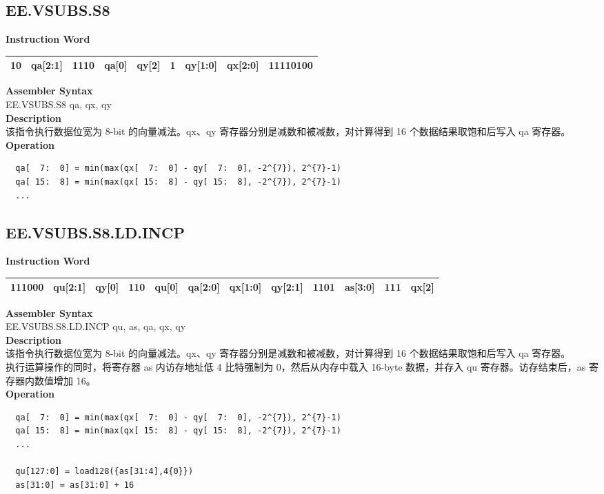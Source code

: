 \clearpage
\subsection{EE.VSUBS.S8}\label{instruction:EEVSUBSS8}
\setlength\tabcolsep{6pt}
\textbf{Instruction Word} \\
\begin{tabular}{|c|c|c|c|c|c|c|c|c|}
	\hline
	10 & qa[2:1] & 1110 & qa[0] & qy[2] & 1 & qy[1:0] & qx[2:0] & 11110100 \\
	\hline
\end{tabular}

\textbf{Assembler Syntax} \\
EE.VSUBS.S8 qa, qx, qy \\
\textbf{Description} \\
该指令执行数据位宽为 8-bit 的向量减法。qx、qy 寄存器分别是减数和被减数，对计算得到 16 个数据结果取饱和后写入 qa 寄存器。\\
\textbf{Operation}
\begin{lstlisting}
  qa[  7:  0] = min(max(qx[  7:  0] - qy[  7:  0], -2^{7}), 2^{7}-1)
  qa[ 15:  8] = min(max(qx[ 15:  8] - qy[ 15:  8], -2^{7}), 2^{7}-1)
  ...
\end{lstlisting}

\clearpage
\subsection{EE.VSUBS.S8.LD.INCP}\label{instruction:EEVSUBSS8LDINCP}
\setlength\tabcolsep{6pt}
\textbf{Instruction Word} \\
\begin{tabular}{|c|c|c|c|c|c|c|c|c|c|c|c|}
	\hline
	111000 & qu[2:1] & qy[0] & 110 & qu[0] & qa[2:0] & qx[1:0] & qy[2:1] & 1101 & as[3:0] & 111 & qx[2] \\
	\hline
\end{tabular}

\textbf{Assembler Syntax} \\
EE.VSUBS.S8.LD.INCP qu, as, qa, qx, qy \\
\textbf{Description} \\
该指令执行数据位宽为 8-bit 的向量减法。qx、qy 寄存器分别是减数和被减数，对计算得到 16 个数据结果取饱和后写入 qa 寄存器。\\ 执行运算操作的同时，将寄存器 as 内访存地址低 4 比特强制为 0，然后从内存中载入 16-byte 数据，并存入 qu 寄存器。访存结束后，as 寄存器内数值增加 16。\\
\textbf{Operation}
\begin{lstlisting}
  qa[  7:  0] = min(max(qx[  7:  0] - qy[  7:  0], -2^{7}), 2^{7}-1)
  qa[ 15:  8] = min(max(qx[ 15:  8] - qy[ 15:  8], -2^{7}), 2^{7}-1)
  ...

  qu[127:0] = load128({as[31:4],4{0}})
  as[31:0] = as[31:0] + 16
\end{lstlisting}


